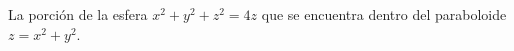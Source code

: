 \item La porción de la esfera $x^2 + y^2 + z^2 = 4z$ que se encuentra dentro del paraboloide $z = x^2 + y^2$.
